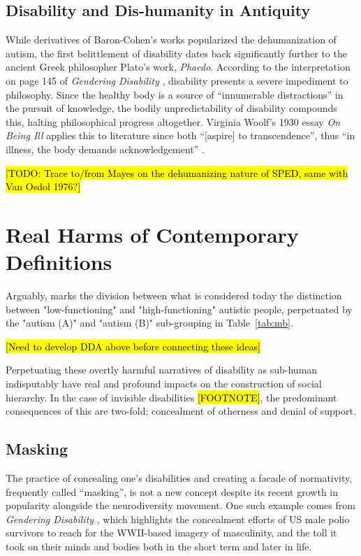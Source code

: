 \documentclass[letterpaper]{article}
\begin{document}
\subsection{Disability and Dis-humanity in Antiquity}
While derivatives of Baron-Cohen's works popularized the dehumanization of autism, the first belittlement of disability dates back significantly further to the ancient Greek philosopher Plato's work, \textit{Phaedo}. According to the interpretation on page 145 of \textit{Gendering Disability} \cite{gendering}, disability presents a severe impediment to philosophy. Since the healthy body is a source of “innumerable distractions” in the pursuit of knowledge, the bodily unpredictability of disability compounds this, halting philosophical progress altogether. Virginia Woolf's 1930 essay \textit{On Being Ill} applies this to literature since both “[aspire] to transcendence”, thus “in illness, the body demands acknowledgement” \cite{gendering}.

\hl{[TODO: Trace to/from Mayes on the dehumanizing nature of SPED, same with Van Osdol 1976?]}

\section{Real Harms of Contemporary Definitions}
Arguably, \cite{vk} marks the division between what is considered today the distinction between "low-functioning" and "high-functioning" autistic people, perpetuated by the "autism (A)" and "autism (B)" sub-grouping in Table~\ref{tab:mb}.

\hl{[Need to develop DDA above before connecting these ideas]}

Perpetuating these overtly harmful narratives of disability as sub-human indisputably have real and profound impacts on the construction of social hierarchy. In the case of invisible disabilities \hl{[FOOTNOTE]}, the predominant consequences of this are two-fold: concealment of otherness and denial of support.

\subsection{Masking}
The practice of concealing one's disabilities and creating a facade of normativity, frequently called “masking”, is not a new concept despite its recent growth in popularity alongside the neurodiversity movement. One such example comes from \textit{Gendering Disability} \cite{gendering}, which highlights the concealment efforts of US male polio survivors to reach for the WWII-based imagery of masculinity, and the toll it took on their minds and bodies both in the short term and later in life.
\end{document}
